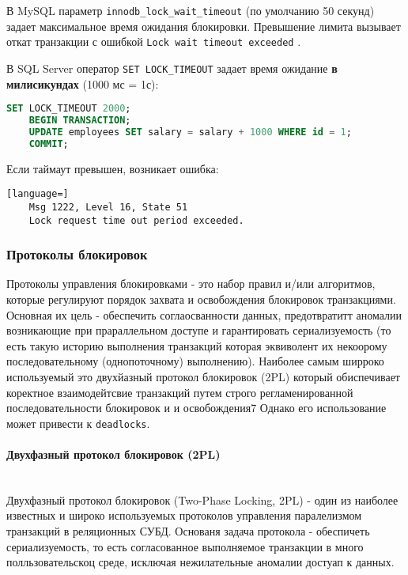 В MySQL параметр \texttt{innodb\_lock\_wait\_timeout} (по умолчанию 50 секунд) задает максимальное время ожидания блокировки. Превышение лимита вызывает откат транзакции с ошибкой \texttt{Lock wait timeout exceeded} \autocite[§17.14]{Mysqldoc4}.

В SQL Server оператор \texttt{SET LOCK\_TIMEOUT} \autocite{MicrosoftLearnSQLserverSetLockTout} задает время ожидание \textbf{в милисикундах} (1000 мс = 1с):
\begin{lstlisting}[language=SQL]
    SET LOCK_TIMEOUT 2000;
    BEGIN TRANSACTION;
    UPDATE employees SET salary = salary + 1000 WHERE id = 1;
    COMMIT;
\end{lstlisting}
Если таймаут превышен, возникает ошибка:
\begin{lstlisting}[language=]
    Msg 1222, Level 16, State 51
    Lock request time out period exceeded.    
\end{lstlisting}


\subsubsection{Протоколы блокировок}

Протоколы управления блокировками - это набор правил и/или алгоритмов, которые регулируют порядок захвата и освобождения блокировок транзакциями. Основная их цель - обеспечить соглаосванности данных, предотвратитт аномалии возникающие при прараллельном доступе и гарантировать сериализуемость (то есть такую историю выполнения транзакций которая эквиволент их некоорому последовательному (однопоточному) выполнению).
Наиболее самым ширроко используемый это двухйазный протокол блокировок (2PL) который обиспечивает коректное взаимодейтсвие транзакций путем строго регламенированной последовательности блокировок и и освобождения7 Однако его использование может привести к \texttt{deadlocks}.


\paragraph{Двухфазный протокол блокировок (2PL)} ~\\


Двухфазный протокол блокировок (Two-Phase Locking, 2PL) - один из наиболее известных и широко используемых протоколов управления паралелизмом транзакций в реляционных СУБД. Основаня задача протокола - обеспичеть сериализуемость, то есть согласованное выполняемое транзакции в много полльзовательскоц среде, исключая нежилательные аномалии достуап к данных.


